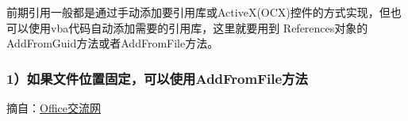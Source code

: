 \documentclass[
]{article}
\begin{document}
前期引用一般都是通过手动添加要引用库或ActiveX(OCX)控件的方式实现，但也可以使用vba代码自动添加需要的引用库，这里就要用到
References对象的AddFromGuid方法或者AddFromFile方法。

\subsubsection{\texorpdfstring{\textbf{1）如果文件位置固定，可以使用AddFromFile方法}}{1）如果文件位置固定，可以使用AddFromFile方法}}\label{1uxff09ux5982ux679cux6587ux4ef6ux4f4dux7f6eux56faux5b9aux53efux4ee5ux4f7fux7528addfromfileux65b9ux6cd5}

摘自：\href{https://link.zhihu.com/?target=http\%3A//www.office-cn.net/forum.php\%3Fmod\%3Dredirect\%26goto\%3Dfindpost\%26ptid\%3D83129\%26pid\%3D529320\%26fromuid\%3D75}{Office交流网}
\end{document}

